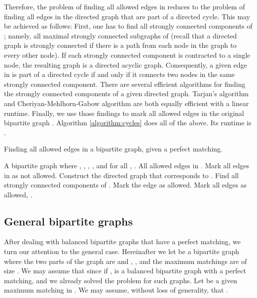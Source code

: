\documentclass[times, 11pt]{article}
\begin{document}
Therefore, the problem of finding all allowed edges in  reduces to the problem of finding all edges in the directed graph 
that are part of a directed cycle. This may be achieved as follows: First, one has to find all strongly connected components of ;
namely, all maximal strongly connected subgraphs of  (recall that a directed graph is strongly connected if
there is a path from each node in the graph to every other node).
If each strongly connected component is contracted to a single node, the resulting graph is a directed acyclic graph.
Consequently, a given edge in  is part of a directed cycle if and only if it connects two nodes in the same strongly
connected component.
There are several efficient algorithms for finding the strongly connected components of a given directed graph.
Tarjan's algorithm \cite{Tar} and Cheriyan-Mehlhorn-Gabow algorithm \cite{CM} are both equally efficient with a linear
runtime. Finally, we use those findings to mark all allowed edges in the original bipartite graph .
Algorithm \ref{algorithm:cycles} does all of the above. Its runtime is .

\begin{algorithm}[h!!]
\caption{\label{algorithm:cycles} Finding all allowed edges in a bipartite graph, given a perfect matching.}
\begin{algorithmic}[1]
\INPUT A bipartite graph  where ,
, , ,
and for all , .
\OUTPUT All allowed edges in .
\STATE Mark all edges in  as not allowed.
\STATE Construct the directed graph  that corresponds to .
\STATE Find all strongly connected components of .
\STATE Mark the edge  as allowed.
\ENDIF
\ENDFOR
\STATE Mark all edges  as allowed, .
\end{algorithmic}
\end{algorithm}

\subsection{General bipartite graphs}\label{sec22}
After dealing with balanced bipartite graphs that have a perfect matching, we turn our attention to the general case.
Hereinafter we let  be a bipartite graph where the two parts of the
graph are  and , , and the maximum matchings are of size .
We may assume that  since if ,  is a balanced bipartite graph with a perfect matching, and we already solved the problem for such graphs.
Let  be a given maximum matching in . We may assume, without loss of generality, that
.
\end{document}

